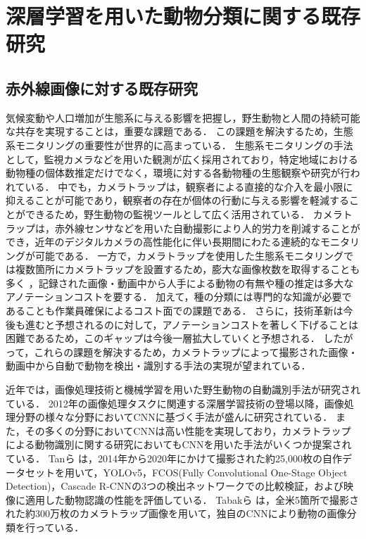 \documentclass[a4paper,11pt,nomag]{jsreport}
\begin{document}
\setcounter{chapter}{2}

\chapter*{深層学習を用いた動物分類に関する既存研究}

\section{赤外線画像に対する既存研究}

気候変動や人口増加が生態系に与える影響を把握し，野生動物と人間の持続可能な共存を実現することは，重要な課題である．
この課題を解決するため，生態系モニタリングの重要性が世界的に高まっている\cite{zwerts2021, bandaru2024}．
生態系モニタリングの手法として，監視カメラなどを用いた観測が広く採用されており，特定地域における動物種の個体数推定だけでなく，環境に対する各動物種の生態観察や研究が行われている\cite{trolliet2014}．
中でも，カメラトラップは，観察者による直接的な介入を最小限に抑えることが可能であり，観察者の存在が個体の行動に与える影響を軽減することができるため，野生動物の監視ツールとして広く活用されている\cite{本郷2018, abood2023}．
カメラトラップは，赤外線センサなどを用いた自動撮影により人的労力を削減することができ，近年のデジタルカメラの高性能化に伴い長期間にわたる連続的なモニタリングが可能である．
一方で，カメラトラップを使用した生態系モニタリングでは複数箇所にカメラトラップを設置するため，膨大な画像枚数を取得することも多く \cite{kays2020, si2014}，記録された画像・動画中から人手による動物の有無や種の推定は多大なアノテーションコストを要する\cite{thangaraj2023}．
加えて，種の分類には専門的な知識が必要であることも作業員確保によるコスト面での課題である．
さらに，技術革新は今後も進むと予想されるのに対して，アノテーションコストを著しく下げることは困難であるため，このギャップは今後一層拡大していくと予想される\cite{安藤2019}．
したがって，これらの課題を解決するため，カメラトラップによって撮影された画像・動画中から自動で動物を検出・識別する手法の実現が望まれている．

近年では，画像処理技術と機械学習を用いた野生動物の自動識別手法が研究されている．
2012年の画像処理タスクに関連する深層学習技術の登場以降，画像処理分野の様々な分野においてCNNに基づく手法が盛んに研究されている．
また，その多くの分野においてCNNは高い性能を実現しており，カメラトラップによる動物識別に関する研究においてもCNNを用いた手法がいくつか提案されている．
Tanら \cite{tan2022}は，2014年から2020年にかけて撮影された約25,000枚の自作データセットを用いて，YOLOv5，FCOS(Fully Convolutional One-Stage Object Detection)，Cascade R-CNNの3つの検出ネットワークでの比較検証，および映像に適用した動物認識の性能を評価している．
Tabakら \cite{tabak2019}は，全米5箇所で撮影された約300万枚のカメラトラップ画像を用いて，独自のCNNにより動物の画像分類を行っている．
\end{document}
